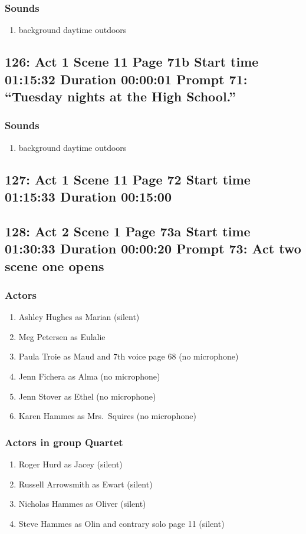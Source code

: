 \subsubsection{Sounds}
\begin{enumerate}
\item background daytime outdoors
\end{enumerate}
\subsection{126: Act 1 Scene 11 Page 71b Start time 01:15:32 Duration 00:00:01 Prompt 71: ``Tuesday nights at the High School.''}
\subsubsection{Sounds}
\begin{enumerate}
\item background daytime outdoors
\end{enumerate}
\subsection{127: Act 1 Scene 11 Page 72 Start time 01:15:33 Duration 00:15:00}

\subsection{128: Act 2 Scene 1 Page 73a Start time 01:30:33 Duration 00:00:20 Prompt 73: Act two scene one opens}

\subsubsection{Actors}
\begin{enumerate}
\item Ashley Hughes as Marian (silent)
\item Meg Petersen as Eulalie
\item Paula Troie as Maud and 7th voice page 68 (no microphone)
\item Jenn Fichera as Alma (no microphone)
\item Jenn Stover as Ethel (no microphone)
\item Karen Hammes as Mrs.~Squires (no microphone)
\end{enumerate}
\subsubsection{Actors in group Quartet}
\begin{enumerate}
\item Roger Hurd as Jacey (silent)
\item Russell Arrowsmith as Ewart (silent)
\item Nicholas Hammes as Oliver (silent)
\item Steve Hammes as Olin and contrary solo page 11 (silent)
\end{enumerate}

